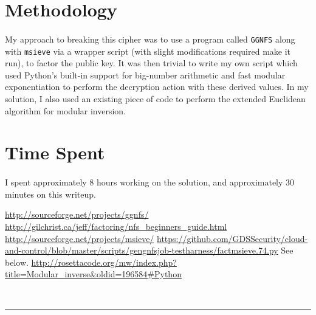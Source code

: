 \documentclass[10pt]{article}
\begin{document}
\section{Methodology}
\paragraph{}
My approach to breaking this cipher was to use a program called
\texttt{GGNFS}\cite{ggnfs-source}\cite{ggnfs-guide} along with
\texttt{msieve}\cite{msieve} via a wrapper script\cite{factmsieve}
(with slight modifications required make it run), to factor the public key. It
was then trivial to write my own script\cite{rsa} which used Python's
built-in support for big-number arithmetic and fast modular
exponentiation to perform the decryption action with these derived
values. In my solution, I also used an existing piece of
code\cite{euclid} to perform the extended Euclidean algorithm for
modular inversion.

\section{Time Spent}
\paragraph{}
I spent approximately 8 hours working on the solution, and
approximately 30 minutes on this writeup.

\pagebreak
\begin{thebibliography}{1}
 \url{http://sourceforge.net/projects/ggnfs/}
 \url{http://gilchrist.ca/jeff/factoring/nfs_beginners_guide.html}
 \url{http://sourceforge.net/projects/msieve/}
 \url{https://github.com/GDSSecurity/cloud-and-control/blob/master/scripts/gengnfsjob-testharness/factmsieve.74.py}
 See below.
 \url{http://rosettacode.org/mw/index.php?title=Modular_inverse&oldid=196584#Python}
\end{thebibliography}

\pagebreak
{}\\[.15cm]
\hrule

\end{document}

